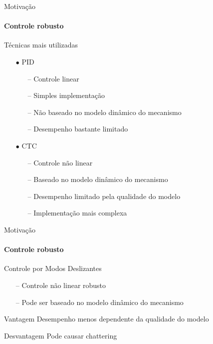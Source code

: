 \documentclass[25pt,landscape]{beamer}
\begin{document}
\begin{frame}{Motiva\c{c}\~ao}
    \framesubtitle{Controle robusto}
    \pause
    \begin{block}{T\'ecnicas mais utilizadas}
    	\begin{itemize}
    		\pause
    		\item[$\bullet$] PID
    		\begin{itemize}
    			\pause
    			\item[--] Controle linear \\[4pt]
    			\item[--] Simples implementa\c{c}\~ao \\[4pt]
    			\item[--] N\~ao baseado no modelo din\^amico do mecanismo \\[4pt]
    			\item[--] Desempenho bastante limitado \\[4pt]
    		\end{itemize}
    		\pause
    		\item[$\bullet$] CTC
    		\begin{itemize}
    			\pause
    			\item[--] Controle n\~ao linear \\[4pt]
    			\item[--] Baseado no modelo din\^amico do mecanismo \\[4pt]
    			\item[--] Desempenho limitado pela qualidade do modelo \\[4pt]
    			\item[--] Implementa\c{c}\~ao mais complexa \\[4pt]
    		\end{itemize}
    	\end{itemize}
    \end{block}
\end{frame}

\begin{frame}{Motiva\c{c}\~ao}
    \framesubtitle{Controle robusto}
    \pause
    \begin{block}{Controle por Modos Deslizantes}
    	\begin{itemize}
    		\pause
    		\item[--] Controle n\~ao linear robusto \\[4pt]
    		\item[--] Pode ser baseado no modelo din\^amico do mecanismo \\[4pt]
    	\end{itemize}
    \end{block}
    \pause
    \begin{exampleblock}{Vantagem}
    	Desempenho menos dependente da qualidade do modelo
    \end{exampleblock}
    \pause
    \begin{exampleblock}{Desvantagem}
        Pode causar chattering
    \end{exampleblock}
\end{frame}
\end{document}
